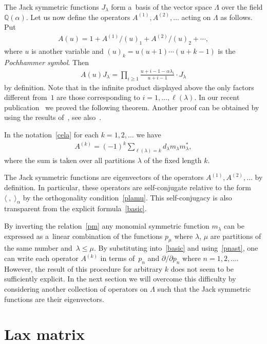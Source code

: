 \documentclass[pdftex]{sigma}
\numberwithin{equation}{section}
\renewcommand\ge{\geqslant}
\renewcommand\le{\leqslant}
\begin{document}
The Jack symmetric functions $J_\lambda$ form a~basis of the vector space $\Lambda$ over the f\/ield
$\mathbb Q(\alpha)$.
Let us now def\/ine the operators $A^{(1)},A^{(2)},\ldots$ acting on
$\Lambda$ as follows.
Put
\begin{gather}
\label{au}
A(u)=1+A^{(1)}/(u)_1+A^{(2)}/(u)_2+\cdots,
\end{gather}
where $u$ is another variable and $(u)_k=u(u+1)\cdots(u+k-1)$ is the \emph{Pochhammer symbol}.
Then
\begin{gather}
\label{ajack}
A(u)J_\lambda=\prod_{i\ge1}\frac{u+i-1-\alpha\lambda_i}{u+i-1}\cdot J_\lambda
\end{gather}
by def\/inition.
Note that in the inf\/inite product displayed above the only factors dif\/ferent from~$1$ are those
corresponding to $i=1,\ldots,\ell(\lambda)$.
In our recent publication~\cite{NS1} we proved the following theorem.
Another proof can be obtained by using the results of~\cite{Shi}, see also~\cite{NS2}.
\begin{theorem}\label{Theorem1}
In the notation~\eqref{cela} for each $k=1,2,\ldots$ we have
\begin{gather}
\label{basic}
A^{(k)}=(-1)^k\sum_{\ell(\lambda)=k}d_\lambda m_\lambda m_\lambda^{\ast},
\end{gather}
where the sum is taken over all partitions $\lambda$ of the fixed length $k$.
\end{theorem}

The Jack symmetric functions are eigenvectors of the operators
$A^{(1)},A^{(2)},\ldots$ by def\/inition.
In particular, these operators are self-conjugate relative to the form $\langle\;,\;\rangle_\alpha$ by the
orthogonality condition~\eqref{plamu}.
This self-conjugacy is also transparent from the explicit formula~\eqref{basic}.

By inverting the relation~\eqref{pm} any monomial symmetric function $m_\lambda$ can be expressed as
a~linear combination of the functions $p_\mu$ where $\lambda$, $\mu$ are partitions of the same number and~$\lambda\le\mu$.
By substituting into~\eqref{basic} and using~\eqref{pnast}, one can write each operator
$A^{(k)}$ in terms of~$p_n$ and $\partial /\partial  p_{n}$ where $n=1,2,\ldots$.
However, the result of this procedure for arbitrary $k$ does not seem to be suf\/f\/iciently explicit.
In the next section we will overcome this dif\/f\/iculty by considering another collection of operators on
$\Lambda$ such that the Jack symmetric functions are their eigenvectors.

\section{Lax matrix}\label{Section6}
\end{document}
